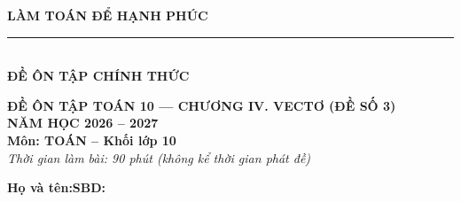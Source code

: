 \documentclass[10pt,a4paper]{article}
\begin{document}
\noindent
\begin{minipage}[c]{0.38\textwidth}
    \centering
    \textbf{LÀM TOÁN ĐỂ HẠNH PHÚC}\\[-2pt]
    \rule{3.2cm}{0.6pt}\\[2pt]
    \textbf{ĐỀ ÔN TẬP CHÍNH THỨC}
\end{minipage}\hfill
\begin{minipage}[c]{0.52\textwidth}
    \centering
    \textbf{ĐỀ ÔN TẬP TOÁN 10 — CHƯƠNG IV. VECTƠ (ĐỀ SỐ 3)}\\[1pt]
    \textbf{NĂM HỌC 2026 -- 2027}\\[1pt]
    \textbf{Môn: TOÁN -- Khối lớp 10}\\
    \textit{\small Thời gian làm bài: 90 phút (không kể thời gian phát đề)}
\end{minipage}

\vspace{0.05cm}
\noindent
\begin{minipage}[b]{0.78\textwidth}
    \textbf{Họ và tên:}\dotfill\textbf{SBD:}\makebox[3.5cm]{\dotfill}
\end{minipage}\hfill
\begin{minipage}[b]{0.20\textwidth}
    \hfill
    \setlength{\fboxrule}{0.8pt}%
\end{minipage}
\vspace{0.05cm}
\end{document}
